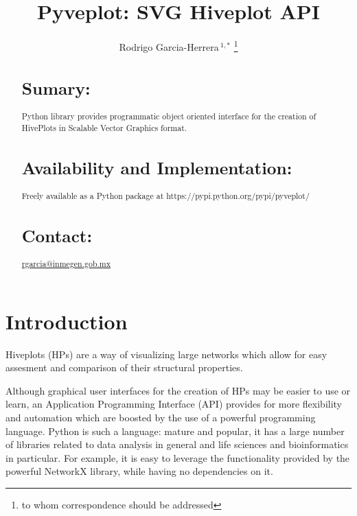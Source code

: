\documentclass{bioinfo}
\begin{document}

\title[short Title]{Pyveplot: SVG Hiveplot API}
\author[Sample \textit{et~al}]{Rodrigo Garcia-Herrera\,$^{1,*}$ \footnote{to whom correspondence should be addressed}}
\address{$^{1}$Department of Bioinformatics, Mexican Institute of
  Genomic Medicine}



\maketitle

\begin{abstract}

\section{Sumary:}
Python library provides programmatic object oriented interface for the creation of
HivePlots in Scalable Vector Graphics format.
\section{Availability and Implementation:}
Freely available as a Python package at
https://pypi.python.org/pypi/pyveplot/

\section{Contact:} \href{rgarcia@inmegen.gob.mx}{rgarcia@inmegen.gob.mx}
\end{abstract}

\section{Introduction}

Hiveplots (HPs) are a way of visualizing large networks which allow
for easy assesment and comparison of their structural properties.
\cite{krzywinski2012hive}

Although graphical user interfaces for the creation of HPs may be
easier to use or learn, an Application Programming Interface
(API) provides for more flexibility and automation which are boosted
by the use of a powerful programming language. Python is such a
language: mature and popular, it has a large number of libraries
related to data analysis in general and life sciences and
bioinformatics in particular. For example, it is easy to leverage the
functionality provided by the powerful NetworkX library, while having
no dependencies on it.
\end{document}
